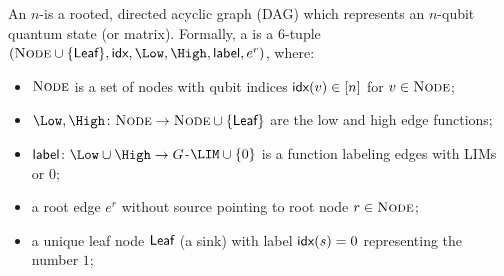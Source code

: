 \begin{definition}[$G$-\limdd]
	\label{def:limdd}
    An $n$-\glimdd is a rooted, directed acyclic graph (DAG) which represents an $n$-qubit quantum state (or matrix).
    Formally, a \glimdd is a $6$-tuple $(\Node\cup \{\leaf\}, \index,\Low,\High,\lbl,e^r)$,
    where:
\begin{itemize}
	\item $\textsc{Node}$ is a set of nodes with qubit indices $\textsf{idx}(v) \in [n]$ for $v\in \textsc{Node}$;
	\item $\Low,\High \colon \Node \to \Node\cup \{\leaf\}$ are the low  and high edge functions;
%		
	\item $\lbl\colon \Low\cup \High\to G$-$\LIM\cup\set 0$ is a function labeling edges with LIMs or $0$;
	\item a root edge $e^r$ without source pointing to root node $r\in \textsc{Node}$;
    \item a unique leaf node $\textsf{Leaf}$ (a sink) with label $\textsf{idx}(s) = 0$ 
    representing the number $1$;

\end{itemize}
\end{definition}
